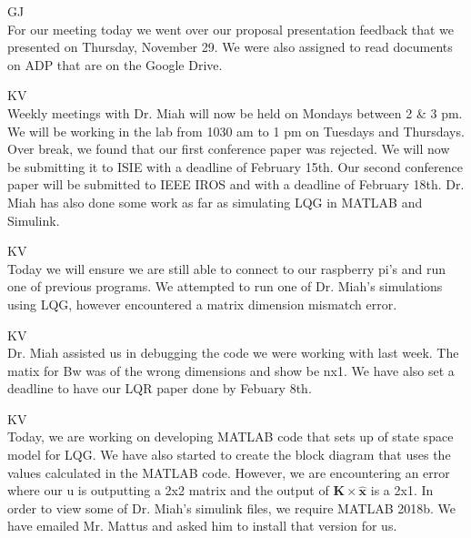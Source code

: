 \documentclass[fontsize=11pt, %
                             paper=letter, %
                             openany, %
                             captions=tableheading,
                             index=totoc,
                             hyperref]{labbook}
\begin{document}
\begin{addmargin}[0cm]{0cm}
GJ\\
For our meeting today we went over our proposal presentation feedback that we presented on Thursday, November 29.  We were also assigned to read documents on ADP that are on the Google Drive.



KV\\
Weekly meetings with Dr. Miah will now be held on Mondays between 2 \& 3 pm.  We will be working in the lab from 1030 am  to 1 pm on Tuesdays and Thursdays.  Over break, we found that our first conference paper was rejected.  We will now be submitting it to ISIE with a deadline of February 15th.  Our second conference paper will be submitted to IEEE IROS and with a deadline of February 18th.  Dr. Miah has also done some work as far as simulating LQG in MATLAB and Simulink.

KV\\
Today we will ensure we are still able to connect to our raspberry pi's and run one of previous programs.  We attempted to run one of Dr. Miah's simulations using LQG, however encountered a matrix dimension mismatch error.

KV\\
Dr. Miah assisted us in debugging the code we were working with last week.  The matix for Bw was of the wrong dimensions and show be nx1.  We have also set a deadline to have our LQR paper done by Febuary 8th.

KV\\
Today, we are working on developing MATLAB code that sets up of state space model for LQG.  We have also started to create the block diagram that uses the values calculated in the MATLAB code.  However, we are encountering an error where our u is outputting a 2x2 matrix and the output of $\mathbf{K}\times\hat{\mathbf{x}}$ is a 2x1.  In order to view some of Dr. Miah's simulink files, we require MATLAB 2018b.  We have emailed Mr. Mattus and asked him to install that version for us.


\end{addmargin}
\end{document}
